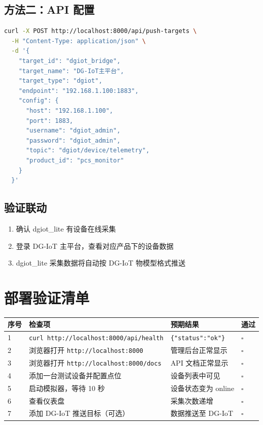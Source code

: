 \documentclass[12pt,a4paper]{ctexart}
\begin{document}
\subsection{方法二：API 配置}

\begin{lstlisting}[language=bash]
curl -X POST http://localhost:8000/api/push-targets \
  -H "Content-Type: application/json" \
  -d '{
    "target_id": "dgiot_bridge",
    "target_name": "DG-IoT主平台",
    "target_type": "dgiot",
    "endpoint": "192.168.1.100:1883",
    "config": {
      "host": "192.168.1.100",
      "port": 1883,
      "username": "dgiot_admin",
      "password": "dgiot_admin",
      "topic": "dgiot/device/telemetry",
      "product_id": "pcs_monitor"
    }
  }'
\end{lstlisting}

\subsection{验证联动}

\begin{enumerate}[leftmargin=*]
  \item 确认 dgiot\_lite 有设备在线采集
  \item 登录 DG-IoT 主平台，查看对应产品下的设备数据
  \item dgiot\_lite 采集数据将自动按 DG-IoT 物模型格式推送
\end{enumerate}

\section{部署验证清单}

\begin{table}[H]\centering
\begin{tabular}{p{1.2cm}p{5.5cm}p{2.5cm}p{2cm}}
\toprule\textbf{序号} & \textbf{检查项} & \textbf{预期结果} & \textbf{通过} \\
\midrule
1 & \texttt{curl http://localhost:8000/api/health} & \texttt{\{"status":"ok"\}} & $\square$ \\
2 & 浏览器打开 \texttt{http://localhost:8000} & 管理后台正常显示 & $\square$ \\
3 & 浏览器打开 \texttt{http://localhost:8000/docs} & API 文档正常显示 & $\square$ \\
4 & 添加一台测试设备并配置点位 & 设备列表中可见 & $\square$ \\
5 & 启动模拟器，等待 10 秒 & 设备状态变为 online & $\square$ \\
6 & 查看仪表盘 & 采集次数递增 & $\square$ \\
7 & 添加 DG-IoT 推送目标（可选） & 数据推送至 DG-IoT & $\square$ \\
\bottomrule
\end{tabular}
\end{table}
\end{document}
